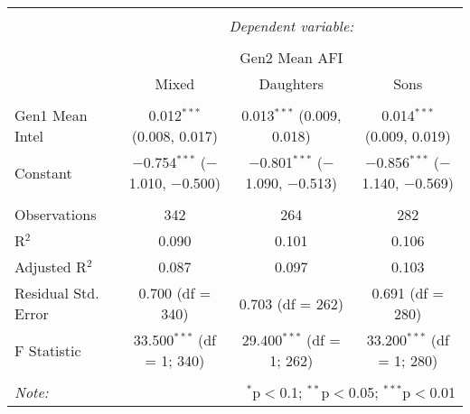 
\begingroup 
\small 
\begin{tabular}{@{\extracolsep{1pt}}lccc} 
\\[-1.8ex]\hline 
\hline \\[-1.8ex] 
 & \multicolumn{3}{c}{\textit{Dependent variable:}} \\ 
\cline{2-4} 
\\[-1.8ex] & \multicolumn{3}{c}{Gen2 Mean AFI} \\ 
 & Mixed & Daughters & Sons \\ 
\hline \\[-1.8ex] 
 Gen1 Mean Intel & 0.012$^{***}$ (0.008, 0.017) & 0.013$^{***}$ (0.009, 0.018) & 0.014$^{***}$ (0.009, 0.019) \\ 
  Constant & $-$0.754$^{***}$ ($-$1.010, $-$0.500) & $-$0.801$^{***}$ ($-$1.090, $-$0.513) & $-$0.856$^{***}$ ($-$1.140, $-$0.569) \\ 
 \hline \\[-1.8ex] 
Observations & 342 & 264 & 282 \\ 
R$^{2}$ & 0.090 & 0.101 & 0.106 \\ 
Adjusted R$^{2}$ & 0.087 & 0.097 & 0.103 \\ 
Residual Std. Error & 0.700 (df = 340) & 0.703 (df = 262) & 0.691 (df = 280) \\ 
F Statistic & 33.500$^{***}$ (df = 1; 340) & 29.400$^{***}$ (df = 1; 262) & 33.200$^{***}$ (df = 1; 280) \\ 
\hline 
\hline \\[-1.8ex] 
\textit{Note:}  & \multicolumn{3}{r}{$^{*}$p$<$0.1; $^{**}$p$<$0.05; $^{***}$p$<$0.01} \\ 
\end{tabular} 
\endgroup 

